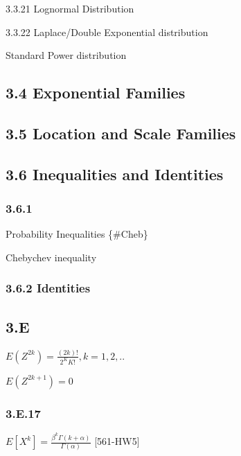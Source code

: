 \documentclass[10pt,twocolumn,portrait]{article}
\begin{document}
3.3.21 Lognormal Distribution

3.3.22 Laplace/Double Exponential distribution

Standard Power distribution

\hypertarget{exponential-families}{%
\subsection{3.4 Exponential Families}\label{exponential-families}}

\hypertarget{location-and-scale-families}{%
\subsection{3.5 Location and Scale
Families}\label{location-and-scale-families}}

\hypertarget{inequalities-and-identities}{%
\subsection{3.6 Inequalities and
Identities}\label{inequalities-and-identities}}

\hypertarget{section-1}{%
\subsubsection{3.6.1}\label{section-1}}

Probability Inequalities \{\#Cheb\}

Chebychev inequality

\hypertarget{identities}{%
\subsubsection{3.6.2 Identities}\label{identities}}

\hypertarget{e}{%
\subsection{3.E}\label{e}}

\(E(Z^{2k})=\frac{(2k)!}{2^KK!}, k=1,2,..\)

\(E(Z^{2k+1})=0\)

\hypertarget{e.17}{%
\subsubsection{3.E.17}\label{e.17}}

\(E[X^k]=\frac{\beta^k\Gamma(k+\alpha)}{\Gamma(\alpha)}\) {[}561-HW5{]}
\end{document}
